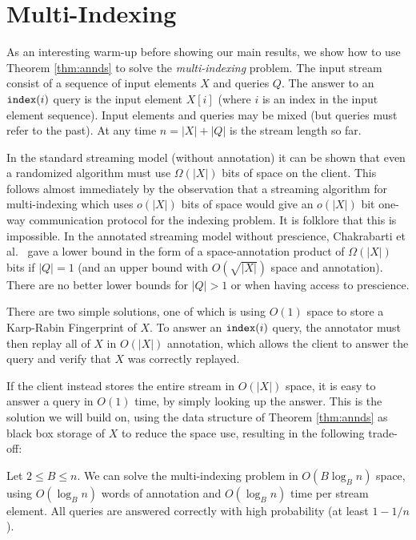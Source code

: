 \section{Multi-Indexing}
As an interesting warm-up before showing our main results, we show how to use Theorem \ref{thm:annds} to solve the \emph{multi-indexing} problem. The input stream consist of a sequence of input elements $X$ and queries $Q$. The answer to an $\mathtt{index}(i)$ query is the input element $X[i]$ (where $i$ is an index in the input element sequence). Input elements and queries may be mixed (but queries must refer to the past). 
At any time $n = |X|+|Q|$ is the stream length so far. %

In the standard streaming model (without annotation) it can be shown that even a randomized algorithm must use $\Omega(|X|)$ bits of space on the client. This follows almost immediately by the observation that a streaming algorithm for multi-indexing which uses $o(|X|)$ bits of space would give an $o(|X|)$ bit one-way communication protocol for the indexing problem. It is folklore that this is impossible.
In the annotated streaming model without prescience, Chakrabarti et al.~\cite{chakrabarti2009annotations} gave a lower bound in the form of a space-annotation product of $\Omega(|X|)$ bits if $|Q| = 1$ (and an upper bound with $O(\sqrt{|X|})$ space and annotation). There are no better lower bounds for $|Q| > 1$ or when having access to prescience.


There are two simple solutions, one of which is using $O(1)$ space to store a Karp-Rabin Fingerprint of $X$. To answer an $\mathtt{index}(i)$ query, the annotator must then replay all of $X$ in $O(|X|)$ annotation, which allows the client to answer the query and verify that $X$ was correctly replayed.

If the client instead stores the entire stream in $O(|X|)$ space, it is easy to answer a query in $O(1)$ time, by simply looking up the answer. This is the solution we will build on, using the data structure of Theorem \ref{thm:annds} as black box storage of $X$ to reduce the space use, resulting in the following trade-off:

\begin{theorem}\label{thm:multiindex}
   Let $2 \leq B \leq n$.   We can solve the multi-indexing problem in $O(B \log_B n)$ space, using $O(\log_B n)$ words of annotation and $O(\log_B n)$ time per stream element. All queries are answered correctly with high probability (at least $1-1/n$).
\end{theorem}

